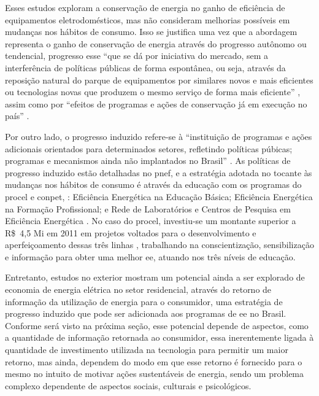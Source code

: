Esses estudos exploram a conservação de energia no ganho de eficiência 
de equipamentos eletrodomésticos, mas não consideram melhorias possíveis
em mudanças nos hábitos de consumo. Isso se justifica uma vez que a abordagem 
representa o ganho de conservação de energia através do progresso autônomo
ou tendencial, progresso esse ``que se dá por iniciativa do mercado, sem a
interferência de políticas públicas de forma espontânea, ou seja, através da
reposição natural do parque de equipamentos por similares novos e mais
eficientes ou tecnologias novas que produzem o mesmo serviço de forma mais
eficiente'' \cite[pp. 1]{pnef}, assim como por ``efeitos de programas e ações de
conservação já em execução no país'' \cite[pp. 247]{pde_2020}. 

Por outro lado, o progresso induzido refere-se à ``instituição de programas e ações
adicionais orientados para determinados setores, refletindo políticas púbicas;
programas e mecanismos ainda não implantados no Brasil'' \cite[pp. 247]{pde_2020}.
As políticas de progresso induzido estão detalhadas no \gls{pnef}, e a
estratégia adotada no tocante às mudanças nos hábitos de consumo é através da
educação com os programas do \gls{procel} e \gls{conpet}, : Eficiência Energética na Educação Básica; Eficiência 
Energética na Formação Profissional; e Rede de Laboratórios e Centros de Pesquisa em Eficiência
Energética \cite[cap. 5]{pnef}. No caso do \gls{procel}, investiu-se um montante superior a
R\$~4,5 Mi em 2011 em projetos voltados para o desenvolvimento e
aperfeiçoamento dessas três linhas \cite{procel_resultados_2012}, trabalhando na
conscientização, sensibilização e informação para obter uma melhor \gls{ee},
atuando nos três níveis de educação.

Entretanto, estudos no exterior mostram um potencial ainda a ser explorado de
economia de energia elétrica no setor residencial, através do retorno de
informação da utilização de energia para o consumidor, uma estratégia de
progresso induzido que pode ser adicionada aos programas de \gls{ee} no Brasil. 
Conforme será visto na próxima seção, esse potencial depende de aspectos, como a quantidade 
de informação retornada ao consumidor, essa inerentemente ligada à quantidade de
investimento utilizada na tecnologia para permitir um maior retorno, mas ainda,
dependem do modo em que esse retorno é fornecido para o mesmo no intuito de
motivar ações sustentáveis de energia, sendo um problema complexo dependente de
aspectos sociais, culturais e psicológicos. 

